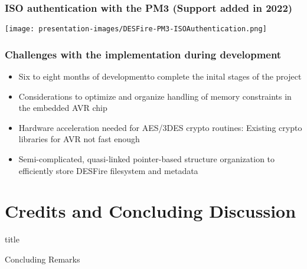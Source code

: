 \documentclass[usenames,svgnames,dvipsnames,11pt]{beamer}
\newcommand{\TitleBoxed}[1]{
     \begin{beamercolorbox}[sep=8pt,center,shadow=true,rounded=true]{title}
          \usebeamerfont{title}#1\par%
     \end{beamercolorbox}
}
\begin{document}
\begin{frame}
\frametitle{ISO authentication with the PM3 (Support added in 2022)}

\begin{center}
\texttt{[image: presentation-images/DESFire-PM3-ISOAuthentication.png]}
\end{center}

\end{frame}

\begin{frame}
\frametitle{Challenges with the implementation during development}

\begin{itemize}
\item Six to eight months of developmentto complete the inital stages of the project 
\item Considerations to optimize and organize handling of memory constraints in the embedded AVR chip
\item Hardware acceleration needed for AES/3DES crypto routines: Existing crypto libraries for AVR not fast enough
\item Semi-complicated, quasi-linked pointer-based structure organization to efficiently store 
      DESFire filesystem and metadata
\end{itemize}

\end{frame}

\section{Credits and Concluding Discussion}

\begin{frame}
\TitleBoxed{
     \Huge{\centerline{Concluding Remarks}}
}
\end{frame}
\end{document}
